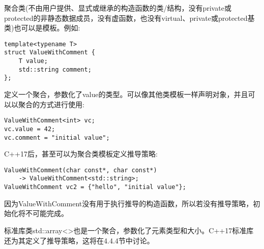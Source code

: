 
聚合类(不由用户提供、显式或继承的构造函数的类/结构，没有private或protected的非静态数据成员，没有虚函数，也没有virtual、private或protected基类)也可以是模板。例如:

\begin{lstlisting}[style=styleCXX]
template<typename T>
struct ValueWithComment {
	T value;
	std::string comment;
};
\end{lstlisting}

定义一个聚合，参数化了value的类型。可以像其他类模板一样声明对象，并且可以以聚合的方式进行使用:

\begin{lstlisting}[style=styleCXX]
ValueWithComment<int> vc;
vc.value = 42;
vc.comment = "initial value";
\end{lstlisting}

C++17后，甚至可以为聚合类模板定义推导策略:

\begin{lstlisting}[style=styleCXX]
ValueWithComment(char const*, char const*)
	-> ValueWithComment<std::string>;
ValueWithComment vc2 = {"hello", "initial value"};
\end{lstlisting}

因为ValueWithComment没有用于执行推导的构造函数，所以若没有推导策略，初始化将不可能完成。

标准库类std::array<>也是一个聚合，参数化了元素类型和大小。C++17标准库还为其定义了推导策略，这将在4.4.4节中讨论。
